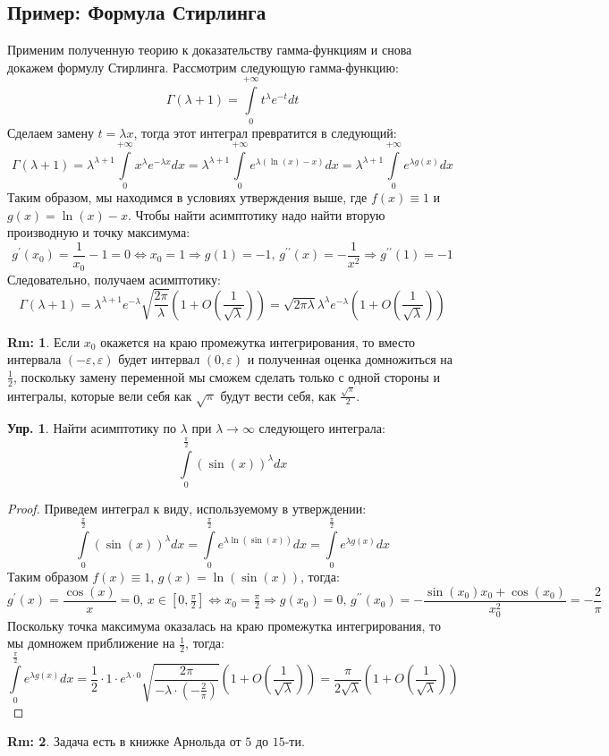 \documentclass[12pt]{article}
\newcommand{\VE}{\varepsilon}
\theoremstyle{definition}
\newtheorem{rem}{Rm:}
\newtheorem{exrc}{Упр.}
\newcommand{\ddint}[2]{\displaystyle\int\limits_{#1}^{#2}}
\begin{document}
\subsection*{Пример: Формула Стирлинга}
Применим полученную теорию к доказательству гамма-функциям и снова докажем формулу Стирлинга. Рассмотрим следующую гамма-функцию:
$$
	\Gamma(\lambda + 1) = \ddint{0}{+\infty}t^{\lambda}e^{-t}dt
$$
Сделаем замену $t = \lambda x$, тогда этот интеграл превратится в следующий:
$$
	\Gamma(\lambda + 1) = \lambda^{\lambda + 1}\ddint{0}{+\infty}x^\lambda e^{-\lambda x}dx = \lambda^{\lambda + 1}\ddint{0}{+\infty}e^{\lambda (\ln{(x)} - x)}dx = \lambda^{\lambda + 1}\ddint{0}{+\infty}e^{\lambda g(x)}dx
$$
Таким образом, мы находимся в условиях утверждения выше, где $f(x) \equiv 1$ и $g(x) = \ln{(x)} - x$. Чтобы найти асимптотику надо найти вторую производную и точку максимума:
$$
	g^\prime(x_0) = \dfrac{1}{x_0} - 1 = 0 \Leftrightarrow x_0 = 1 \Rightarrow g(1) = -1, \, g^{\prime\prime}(x) = -\dfrac{1}{x^2} \Rightarrow g^{\prime\prime}(1) = -1
$$
Следовательно, получаем асимптотику:
$$
	\Gamma(\lambda + 1) = \lambda^{\lambda + 1}e^{-\lambda}\sqrt{\dfrac{2\pi}{\lambda}}\left(1 + O\left(\dfrac{1}{\sqrt{\lambda}}\right)\right) = \sqrt{2 \pi \lambda}\lambda^{\lambda}e^{-\lambda}\left(1 + O\left(\dfrac{1}{\sqrt{\lambda}}\right)\right)
$$
\begin{rem}
	Если $x_0$ окажется на краю промежутка интегрирования, то вместо интервала $(-\VE, \VE)$ будет интервал $(0, \VE)$ и полученная оценка домножиться на $\tfrac{1}{2}$, поскольку замену переменной мы сможем сделать только с одной стороны и интегралы, которые вели себя как $\sqrt{\pi}$ будут вести себя, как $\tfrac{\sqrt{\pi}}{2}$.
\end{rem}
\begin{exrc}
	Найти асимптотику по $\lambda$ при $\lambda \to \infty$ следующего интеграла:
	$$
		\ddint{0}{\tfrac{\pi}{2}}(\sin{(x)})^\lambda dx
	$$
\end{exrc}
\begin{proof}
	Приведем интеграл к виду, используемому в утверждении:
	$$
		\ddint{0}{\tfrac{\pi}{2}}(\sin{(x)})^\lambda dx = \ddint{0}{\tfrac{\pi}{2}}e^{\lambda \ln{(\sin{(x)})}}dx = \ddint{0}{\tfrac{\pi}{2}}e^{\lambda g(x)}dx
	$$
	Таким образом  $f(x) \equiv 1, \, g(x) = \ln{(\sin(x))}$, тогда:
	$$
		g^\prime(x) = \dfrac{\cos{(x)}}{x} = 0, \, x \in \left[0,\tfrac{\pi}{2}\right] \Leftrightarrow x_0 = \tfrac{\pi}{2} \Rightarrow g(x_0) = 0, \, g^{\prime\prime}(x_0) = -\dfrac{\sin{(x_0)}x_0 + \cos{(x_0)}}{x_0^2} = -\dfrac{2}{\pi} 
	$$
	Поскольку точка максимума оказалась на краю промежутка интегрирования, то мы домножем приближение на $\tfrac{1}{2}$, тогда:
	$$
		\ddint{0}{\tfrac{\pi}{2}}e^{\lambda g(x)}dx = \dfrac{1}{2}{\cdot} 1{\cdot}e^{\lambda{\cdot}0}\sqrt{\dfrac{2\pi}{-\lambda {\cdot}\left(-\tfrac{2}{\pi}\right)}}\left(1 + O\left(\dfrac{1}{\sqrt{\lambda}}\right)\right) = \dfrac{\pi}{2\sqrt{\lambda}}\left(1 + O\left(\dfrac{1}{\sqrt{\lambda}}\right)\right)
	$$
\end{proof}
\begin{rem}
	Задача есть в книжке Арнольда от $5$ до $15$-ти.
\end{rem}
\end{document}
